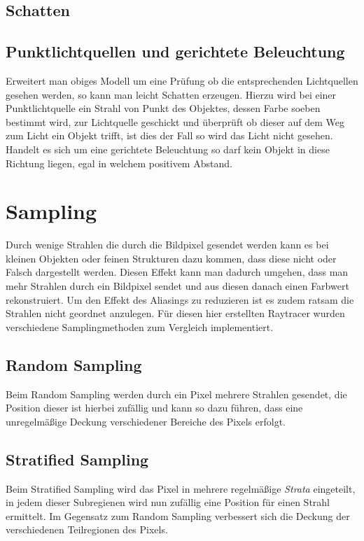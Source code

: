 \documentclass[a4paper]{article}
\begin{document}
\subsection*{Schatten}
\subsection*{Punktlichtquellen und gerichtete Beleuchtung}
Erweitert man obiges Modell um eine Prüfung ob die entsprechenden Lichtquellen gesehen werden, so kann man leicht Schatten erzeugen. Hierzu wird bei einer Punktlichtquelle ein Strahl von Punkt des Objektes, dessen Farbe soeben bestimmt wird, zur Lichtquelle geschickt und überprüft ob dieser auf dem Weg zum Licht ein Objekt trifft, ist dies der Fall so wird das Licht nicht gesehen. Handelt es sich um eine gerichtete Beleuchtung so darf kein Objekt in diese Richtung liegen, egal in welchem positivem Abstand.

\section*{Sampling}
Durch wenige Strahlen die durch die Bildpixel gesendet werden kann es bei kleinen Objekten oder feinen Strukturen dazu kommen, dass diese nicht oder Falsch dargestellt werden. Diesen Effekt kann man dadurch umgehen, dass man mehr Strahlen durch ein Bildpixel sendet und aus diesen danach einen Farbwert rekonstruiert. Um den Effekt des Aliasings zu reduzieren ist es zudem ratsam die Strahlen nicht geordnet anzulegen. Für diesen hier erstellten Raytracer wurden verschiedene Samplingmethoden zum Vergleich implementiert.

\subsection*{Random Sampling}
Beim Random Sampling werden durch ein Pixel mehrere Strahlen gesendet, die Position dieser ist hierbei zufällig und kann so dazu führen, dass eine unregelmäßige Deckung verschiedener Bereiche des Pixels erfolgt.

\subsection*{Stratified Sampling}
Beim Stratified Sampling wird das Pixel in mehrere regelmäßige \textit{Strata} eingeteilt, in jedem dieser Subregienen wird nun zufällig eine Position für einen Strahl ermittelt. Im Gegensatz zum Random Sampling verbessert sich die Deckung der verschiedenen Teilregionen des Pixels.
\end{document}
